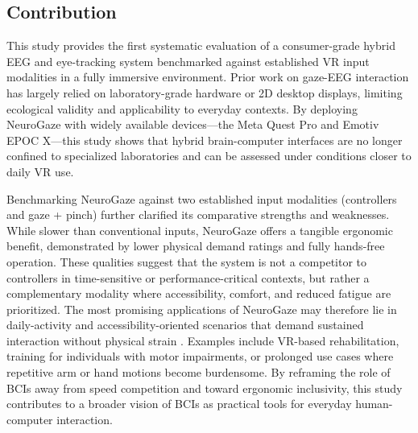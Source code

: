 \documentclass[utf8]{FrontiersinHarvard} %
\begin{document}
\subsection{Contribution}
This study provides the first systematic evaluation of a consumer-grade hybrid EEG and eye-tracking system benchmarked against established VR input modalities in a fully immersive environment. Prior work on gaze-EEG interaction has largely relied on laboratory-grade hardware or 2D desktop displays, limiting ecological validity and applicability to everyday contexts. By deploying NeuroGaze with widely available devices—the Meta Quest Pro and Emotiv EPOC X—this study shows that hybrid brain-computer interfaces are no longer confined to specialized laboratories and can be assessed under conditions closer to daily VR use.

Benchmarking NeuroGaze against two established input modalities (controllers and gaze + pinch) further clarified its comparative strengths and weaknesses. While slower than conventional inputs, NeuroGaze offers a tangible ergonomic benefit, demonstrated by lower physical demand ratings and fully hands-free operation. These qualities suggest that the system is not a competitor to controllers in time-sensitive or performance-critical contexts, but rather a complementary modality where accessibility, comfort, and reduced fatigue are prioritized.
The most promising applications of NeuroGaze may therefore lie in daily-activity  and accessibility-oriented scenarios that demand sustained interaction without physical strain \citep{Sellers01102010}. Examples include VR-based rehabilitation, training for individuals with motor impairments, or prolonged use cases where repetitive arm or hand motions become burdensome. By reframing the role of BCIs away from speed competition and toward ergonomic inclusivity, this study contributes to a broader vision of BCIs as practical tools for everyday human-computer interaction.
\end{document}
